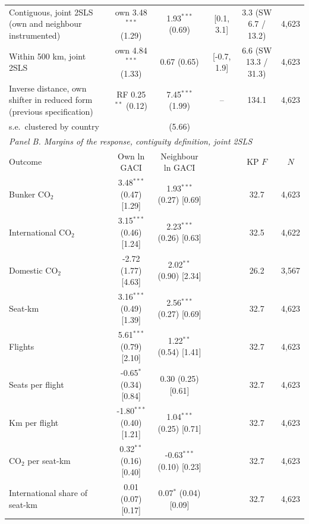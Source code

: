 \documentclass[12pt]{article}
\begin{document}
\begin{table}[htbp]
\begin{threeparttable}
\begin{tabular}{lccccc}
  Contiguous, joint 2SLS (own and neighbour instrumented) & own 3.48$^{***}$ (1.29) & 1.93$^{***}$ (0.69) & [0.1, 3.1] & 3.3 (SW 6.7 / 13.2) & 4,623 \\
  Within 500 km, joint 2SLS & own 4.84$^{***}$ (1.33) & 0.67 (0.65) & [-0.7, 1.9] & 6.6 (SW 13.3 / 31.3) & 4,623 \\
  Inverse distance, own shifter in reduced form (previous specification) & RF 0.25$^{**}$ (0.12) & 7.45$^{***}$ (1.99) & -- & 134.1 & 4,623 \\
  \quad s.e.\ clustered by country & & (5.66) & & & \\
\midrule
\multicolumn{6}{l}{\textit{Panel B. Margins of the response, contiguity definition, joint 2SLS}} \\
Outcome & Own ln GACI & Neighbour ln GACI & & KP $F$ & $N$ \\
\midrule
  Bunker CO$_2$ & 3.48$^{***}$ (0.47) [1.29] & 1.93$^{***}$ (0.27) [0.69] & & 32.7 & 4,623 \\
  International CO$_2$ & 3.15$^{***}$ (0.46) [1.24] & 2.23$^{***}$ (0.26) [0.63] & & 32.5 & 4,622 \\
  Domestic CO$_2$ & -2.72 (1.77) [4.63] & 2.02$^{**}$ (0.90) [2.34] & & 26.2 & 3,567 \\
  Seat-km & 3.16$^{***}$ (0.49) [1.39] & 2.56$^{***}$ (0.27) [0.69] & & 32.7 & 4,623 \\
  Flights & 5.61$^{***}$ (0.79) [2.10] & 1.22$^{**}$ (0.54) [1.41] & & 32.7 & 4,623 \\
  Seats per flight & -0.65$^{*}$ (0.34) [0.84] & 0.30 (0.25) [0.61] & & 32.7 & 4,623 \\
  Km per flight & -1.80$^{***}$ (0.40) [1.21] & 1.04$^{***}$ (0.25) [0.71] & & 32.7 & 4,623 \\
  CO$_2$ per seat-km & 0.32$^{**}$ (0.16) [0.40] & -0.63$^{***}$ (0.10) [0.23] & & 32.7 & 4,623 \\
  International share of seat-km & 0.01 (0.07) [0.17] & 0.07$^{*}$ (0.04) [0.09] & & 32.7 & 4,623 \\
\bottomrule
\end{tabular}
\begin{tablenotes}[flushleft]
\footnotesize

\end{tablenotes}
\end{threeparttable}
\end{table}
\end{document}
